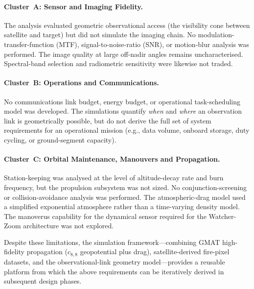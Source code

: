 \paragraph{Cluster~A: Sensor and Imaging Fidelity.}
The analysis evaluated geometric observational access (the visibility cone between satellite and target) but did not simulate the imaging chain. No modulation-transfer-function (MTF), signal-to-noise-ratio (SNR), or motion-blur analysis was performed. The image quality at large off-nadir angles remains uncharacterised. Spectral-band selection and radiometric sensitivity were likewise not traded.

\paragraph{Cluster~B: Operations and Communications.}
No communications link budget, energy budget, or operational task-scheduling model was developed. The simulations quantify \emph{when} and \emph{where} an observation link is geometrically possible, but do not derive the full set of system requirements for an operational mission (e.g., data volume, onboard storage, duty cycling, or ground-segment capacity).

\paragraph{Cluster~C: Orbital Maintenance, Manouvers and Propagation.}
Station-keeping was analysed at the level of altitude-decay rate and burn frequency, but the propulsion subsystem was not sized. No conjunction-screening or collision-avoidance analysis was performed. The atmospheric-drag model used a simplified exponential atmosphere rather than a time-varying density model. The manoverus capability for the dynamical sensor required for the Watcher-Zoom architecture was not explored.

\medskip

\noindent Despite these limitations, the simulation framework---combining GMAT high-fidelity propagation ($c_{8,8}$ geopotential plus drag), satellite-derived fire-pixel datasets, and the observational-link geometry model---provides a reusable platform from which the above requirements can be iteratively derived in subsequent design phases.



